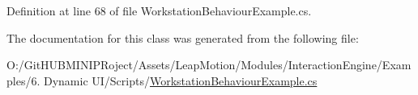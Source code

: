 Definition at line 68 of file Workstation\+Behaviour\+Example.\+cs.



The documentation for this class was generated from the following file\+:\begin{DoxyCompactItemize}
\item 
O\+:/\+Git\+H\+U\+B\+M\+I\+N\+I\+P\+Roject/\+Assets/\+Leap\+Motion/\+Modules/\+Interaction\+Engine/\+Examples/6. Dynamic U\+I/\+Scripts/\mbox{\hyperlink{_workstation_behaviour_example_8cs}{Workstation\+Behaviour\+Example.\+cs}}\end{DoxyCompactItemize}
